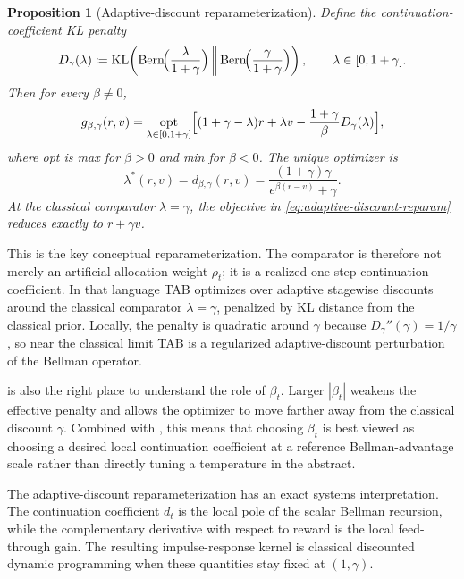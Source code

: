 \documentclass{article}
\newtheorem{proposition}[proposition]{Proposition}
\theoremstyle{remark}
\DeclareMathOperator{\Bern}{Bern}
\newcommand{\KL}{\mathrm{KL}}
\newcommand{\defeq}{\coloneqq}
\begin{document}
\begin{proposition}[Adaptive-discount reparameterization]
\label{prop:adaptive-discount-reparam}
Define the continuation-coefficient KL penalty
\[
D_\gamma(\lambda)
\defeq
\KL\!\left(
\Bern\!\Bigl(\frac{\lambda}{1+\gamma}\Bigr)
\,\middle\|\,
\Bern\!\Bigl(\frac{\gamma}{1+\gamma}\Bigr)
\right),
\qquad \lambda\in[0,1+\gamma].
\]
Then for every $\beta\neq 0$,
\begin{equation}
g_{\beta,\gamma}(r,v)
=
\underset{\lambda\in[0,1+\gamma]}{\mathrm{opt}}
\Bigl[
(1+\gamma-\lambda)r + \lambda v - \frac{1+\gamma}{\beta}D_\gamma(\lambda)
\Bigr],
\label{eq:adaptive-discount-reparam}
\end{equation}
where \textnormal{opt} is \textnormal{max} for $\beta>0$ and \textnormal{min} for $\beta<0$. The unique optimizer is
\[
\lambda^*(r,v)=d_{\beta,\gamma}(r,v)=\frac{(1+\gamma)\gamma}{e^{\beta(r-v)}+\gamma}.
\]
At the classical comparator $\lambda=\gamma$, the objective in \eqref{eq:adaptive-discount-reparam} reduces exactly to $r+\gamma v$.
\end{proposition}

This is the key conceptual reparameterization. The comparator is therefore not merely an artificial allocation weight $\rho_t$; it is a realized one-step continuation coefficient. In that language TAB optimizes over adaptive stagewise discounts around the classical comparator $\lambda=\gamma$, penalized by KL distance from the classical prior. Locally, the penalty is quadratic around $\gamma$ because $D_\gamma''(\gamma)=1/\gamma$, so near the classical limit TAB is a regularized adaptive-discount perturbation of the Bellman operator.

 is also the right place to understand the role of $\beta_t$. Larger $|\beta_t|$ weakens the effective penalty and allows the optimizer to move farther away from the classical discount $\gamma$. Combined with , this means that choosing $\beta_t$ is best viewed as choosing a desired local continuation coefficient at a reference Bellman-advantage scale rather than directly tuning a temperature in the abstract.


The adaptive-discount reparameterization has an exact systems interpretation. The continuation coefficient $d_t$ is the local pole of the scalar Bellman recursion, while the complementary derivative with respect to reward is the local feed-through gain. The resulting impulse-response kernel is classical discounted dynamic programming when these quantities stay fixed at $(1,\gamma)$.
\end{document}
